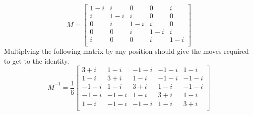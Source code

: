 \documentclass{article}
\theoremstyle{plain}
\begin{document}
\[\overline{M} = \begin{bmatrix}
    1 - i & i & 0 & 0 & i \\
    i & 1 - i & i & 0 & 0 \\
    0 & i & 1 - i & i & 0 \\
    0 & 0 & i & 1 - i & i \\
    i & 0 & 0 & i & 1 - i \\
\end{bmatrix}\]
 Multiplying the following matrix by any position should give the moves required to get to the identity.
\[\overline{M}^{-1} = \frac16\begin{bmatrix}
    3+i & 1-i & -1-i & -1-i & 1-i \\
    1-i & 3+i & 1-i & -1-i & -1-i \\
    -1-i & 1-i & 3+i & 1-i & -1-i \\
    -1-i & -1-i & 1-i & 3+i & 1-i \\
    1-i & -1-i & -1-i & 1-i & 3+i \\
\end{bmatrix}\]
\end{document}
